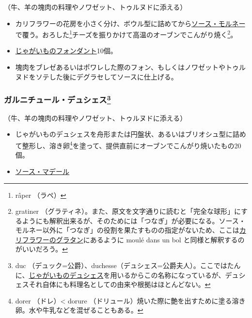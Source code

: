 \begin{recette}


（牛、羊の塊肉の料理やノワゼット、トゥルヌドに添える）

\begin{itemize}
\item
  カリフラワーの花房を小さく分け、ボウル型に詰めてから\protect\hyperlink{sauce-mornay}{ソース・モルネー}で覆う。おろした\footnote{râper
    （ラペ）}チーズを振りかけて高温のオーブンでこんがり焼く\footnote{gratiner
    （グラティネ）。また、原文を文字通りに読むと「完全な球形」にするようにも解釈出来るが、そのためには「つなぎ」が必要になる。ソース・モルネー以外に「つなぎ」の役割を果たすものの指定がないため、ここは\protect\hyperlink{chou-fleur-au-gratin}{カリフラワーのグラタン}にあるように
    moulé dans un bol と同様と解釈するのがいいだろう。}。
\item
  \protect\hyperlink{pommes-de-terre-fondantes}{じゃがいものフォンダント}10個。
\item
  塊肉をブレゼあるいはポワレした際のフォン、もしくはノワゼットやトゥルヌドをソテした後にデグラセしてソースに仕上げる。
\end{itemize}

\hypertarget{garniture-a-la-duchesse}{%
\subsubsection[ガルニチュール・デュシェス]{\texorpdfstring{ガルニチュール・デュシェス\footnote{duc
  （デュック=公爵）、duchesse（デュシェス=公爵夫人）。ここではたんに、\protect\hyperlink{pommes-de-terre-duchesse}{じゃがいものデュシェス}を用いるからこの名称になっているが、デュシェスそれ自体にも料理名としての由来や根拠はほとんどない。}}{ガルニチュール・デュシェス}}\label{garniture-a-la-duchesse}}



（牛、羊の塊肉の料理やノワゼット、トゥルヌドに添える）

\begin{itemize}
\item
  じゃがいものデュシェスを舟形または円盤状、あるいはブリオシュ型に詰めて整形し、溶き卵\footnote{dorer
    （ドレ）\textless{} dorure
    （ドリュール）焼いた際に艶を出すために塗る溶き卵。水や牛乳などを混ぜることもある。}を塗って、提供直前にオーブンでこんがり焼いたもの20個。
\item
  \protect\hyperlink{sauce-madere}{ソース・マデール}
\end{itemize}


\end{recette}
